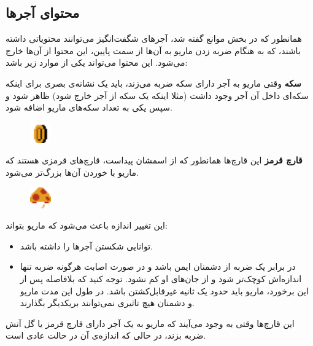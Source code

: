 \documentclass{utap}
\begin{document}
	\subsection{محتوای آجرها}
همانطور که در بخش موانع گفته شد، آجر‌های شگفت‌انگیز می‌توانند محتویاتی داشته باشند، که به هنگام ضربه زدن ماریو به آن‌ها از سمت پایین، این محتوا از آن‌ها خارج می‌شود. این محتوا می‌تواند یکی از موارد زیر باشد:
	\begin{itemize}
			\begin{minipage}{.75\textwidth}
		\item
				
\textbf{سکه}
وقتی ماریو به آجر دارای سکه ضربه می‌زند، باید یک نشانه‌ی بصری برای اینکه سکه‌ای داخل آن آجر وجود داشت (مثلا اینکه یک سکه از آجر خارج شود) ظاهر شود و سپس یکی به تعداد سکه‌های ماریو اضافه شود.
\end{minipage}
\begin{minipage}{.15\textwidth}
\begin{figure}[H]
	\begin{center}
		\includegraphics[width=0.9cm]{coin}
	\end{center}
\end{figure}
\end{minipage}

	\begin{minipage}{.75\textwidth}
		\item
\textbf{قارچ قرمز}
این قارچ‌ها همانطور که از اسمشان پیداست، قارچ‌های قرمزی هستند که ماریو با خوردن آن‌ها بزرگ‌تر می‌شود.
\end{minipage}
\begin{minipage}{.15\textwidth}
	\begin{figure}[H]
		\begin{center}
			\includegraphics[width=0.9cm]{red}
		\end{center}
	\end{figure}
\end{minipage}

این تغییر اندازه باعث می‌شود که ماریو بتواند:
		\begin{itemize}
			\item
توانایی شکستن آجر‌ها را داشته باشد.
			\item
در برابر یک ضربه از دشمنان ایمن باشد و در صورت اصابت هرگونه ضربه تنها اندازه‌اش کوچک‌تر شود و از جان‌های او کم نشود. توجه کنید که بلافاصله پس از این برخورد، ماریو باید حدود یک ثانیه غیرقابل‌کشتن باشد. در طول این مدت ماریو و دشمنان هیچ تاثیری نمی‌توانند بر‌یکدیگر بگذارند.
		\end{itemize}
		این قارچ‌ها وقتی به وجود می‌آیند که ماریو به یک آجر دارای قارچ قرمز یا گل آتش ضربه بزند، در حالی که اندازه‌ی آن در حالت عادی است.


\end{itemize}
\end{document}
